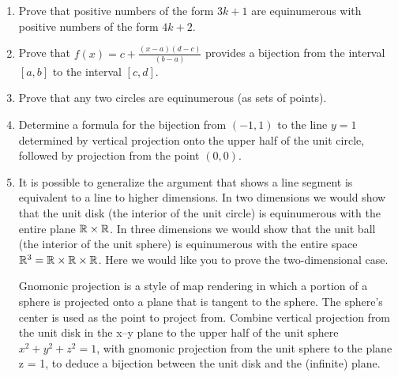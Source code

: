 \begin{enumerate}
\item  Prove that positive numbers of the form $3k +1$ are equinumerous with
positive numbers of the form $4k + 2$.

\item Prove that $\displaystyle f(x) =  c + \frac{(x-a)(d-c)}{(b-a)}$ 
provides a bijection from the interval $[a, b]$ to the interval $[c, d]$.

\item Prove that any two circles are equinumerous (as sets of points).

\item Determine a formula for the bijection from $(-1, 1)$ to the line $y = 1$
determined by vertical projection onto the upper half of the unit circle,
followed by projection from the point $(0, 0)$.

\item  It is possible to generalize the argument that shows a line segment is
equivalent to a line to higher dimensions.   In two dimensions we would
show that the unit disk (the interior of the unit circle) is equinumerous
with the entire plane ${\mathbb R} \times {\mathbb R}$.   In three dimensions we would show that
the unit ball (the interior of the unit sphere) is equinumerous with the
entire space ${\mathbb R}^3 = {\mathbb R} \times {\mathbb R} \times {\mathbb R}$.  Here we 
would like you to prove the two-dimensional case.

Gnomonic projection is a style of map rendering in which a portion of a
sphere is projected onto a plane that is tangent to the sphere.  The 
sphere's center is used as the point to project from.  Combine 
vertical projection from the unit disk
in the x--y plane to the upper half of the unit sphere $x^2 + y^2 + z^2 = 1$,
with gnomonic projection from the unit sphere to the plane z = 1, to
deduce a bijection between the unit disk and the (infinite) plane.

\end{enumerate}
 

